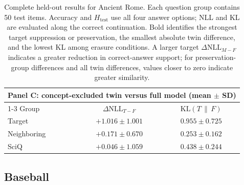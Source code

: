 \begin{table}[h]
  \vspace{1em}
  \begin{tabular}{lcc}
    \toprule
    \multicolumn{3}{l}{\textbf{Panel C: concept-excluded twin versus full model (mean $\pm$ SD)}} \\
    \cmidrule(lr){1-3}
    Group & $\Delta\mathrm{NLL}_{T-F}$ & $\mathrm{KL}(T\,\|\,F)$ \\
    \midrule
    Target      & $+1.016 \pm 1.001$ & $0.955 \pm 0.725$ \\
    Neighboring & $+0.171 \pm 0.670$ & $0.253 \pm 0.162$ \\
    SciQ        & $+0.046 \pm 1.059$ & $0.438 \pm 0.244$ \\
    \bottomrule
  \end{tabular}
  \caption{Complete held-out results for Ancient Rome. Each question group
  contains 50 test items. Accuracy and $H_{\mathrm{test}}$ use all four answer
  options; NLL and KL are evaluated along the correct continuation. Bold
  identifies the strongest target suppression or preservation, the smallest
  absolute twin difference, and the lowest KL among erasure conditions. A
  larger target $\Delta\mathrm{NLL}_{M-F}$ indicates a greater reduction in
  correct-answer support; for preservation-group differences and all twin
  differences, values closer to zero indicate greater similarity.}
  \label{tab:appendix-rome-results}
\end{table}

\clearpage
\subsection{Baseball}

